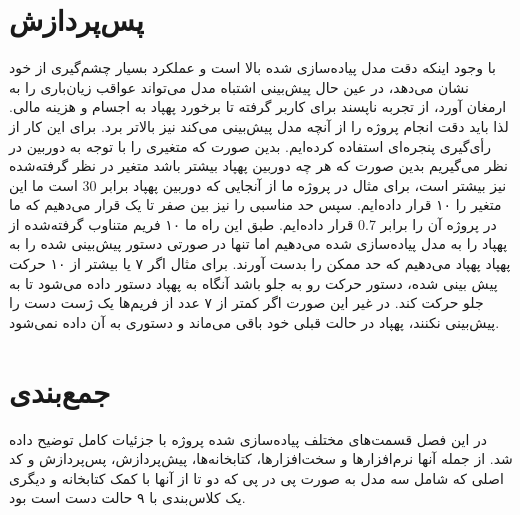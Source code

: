 \section{پس‌پردازش}
با وجود اینکه دقت مدل پیاده‌سازی شده بالا است و عملکرد بسیار چشم‌گیری از خود نشان می‌دهد، در عین حال پیش‌بینی اشتباه مدل می‌تواند عواقب زیان‌باری را به ارمغان آورد، 
از تجربه ناپسند برای کاربر گرفته تا برخورد پهپاد به اجسام و هزینه مالی. لذا باید دقت انجام پروژه را از آنچه مدل پیش‌بینی می‌کند نیز بالاتر برد. برای این کار از رأی‌گیری پنجره‌ای 
استفاده کرده‌ایم. بدین صورت که متغیری را با توجه به  دوربین در نظر می‌گیریم بدین صورت که هر چه  دوربین پهپاد بیشتر باشد متغیر در نظر گرفته‌شده نیز بیشتر 
است، برای مثال در پروژه ما از آنجایی که دوربین پهپاد برابر 30  است ما این متغیر را ۱۰ قرار داده‌ایم.  سپس حد مناسبی را نیز بین صفر تا یک قرار می‌دهیم که ما در 
پروژه آن را برابر 0.7  قرار داده‌ایم. طبق این راه ما ۱۰ فریم متناوب گرفته‌شده از پهپاد را به مدل پیاده‌سازی شده می‌دهیم اما تنها در صورتی دستور پیش‌بینی شده را به پهپاد
پهپاد می‌دهیم که حد ممکن را بدست آورند. برای مثال اگر ۷ یا بیشتر از ۱۰ حرکت پیش بینی شده، دستور حرکت رو به جلو باشد آنگاه به پهپاد دستور داده می‌شود تا به جلو حرکت کند. 
در غیر این صورت اگر کمتر از ۷ عدد از فریم‌ها یک ژست دست را پیش‌بینی نکنند، پهپاد در حالت قبلی خود باقی می‌ماند و دستوری به آن داده نمی‌شود.


\section{جمع‌بندی}
در این فصل قسمت‌های مختلف پیاده‌سازی شده پروژه با جزئیات کامل توضیح داده شد. از جمله آنها نرم‌افزار‌ها و سخت‌افزارها، کتابخانه‌ها، پیش‌پردازش، پس‌پردازش و کد اصلی که شامل سه مدل به صورت پی در پی که دو تا از آنها با کمک کتابخانه  و دیگری یک کلاس‌بندی با ۹ حالت دست است بود.

